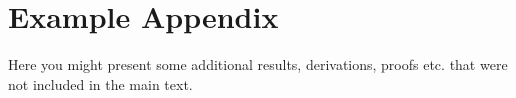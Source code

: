\chapter{Example Appendix}

Here you might present some additional results, derivations, proofs etc. that were not included in the main text.

